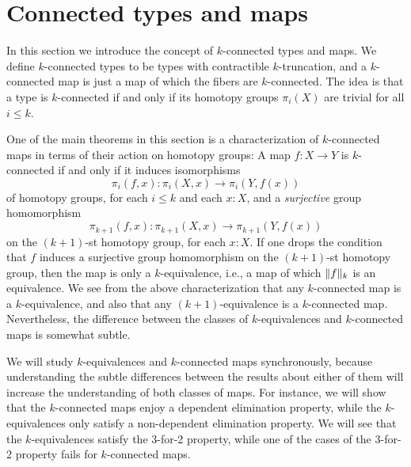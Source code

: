 
\section{Connected types and maps}

In this section we introduce the concept of $k$-connected types and maps. We define $k$-connected types to be types with contractible $k$-truncation, and a $k$-connected map is just a map of which the fibers are $k$-connected. The idea is that a type is $k$-connected if and only if its homotopy groups $\pi_i(X)$ are trivial for all $i\leq k$.

One of the main theorems in this section is a characterization of $k$-connected maps in terms of their action on homotopy groups: A map $f:X\to Y$ is $k$-connected if and only if it induces isomorphisms
\begin{equation*}
  \pi_i(f,x):\pi_i(X,x)\to\pi_i(Y,f(x))
\end{equation*}
of homotopy groups, for each $i\leq k$ and each $x:X$, and a \emph{surjective} group homomorphism
\begin{equation*}
  \pi_{k+1}(f,x):\pi_{k+1}(X,x)\to\pi_{k+1}(Y,f(x))
\end{equation*}
on the $(k+1)$-st homotopy group, for each $x:X$. If one drops the condition that $f$ induces a surjective group homomorphism on the $(k+1)$-st homotopy group, then the map is only a $k$-equivalence, i.e., a map of which $\trunc{k}{f}$ is an equivalence. We see from the above characterization that any $k$-connected map is a $k$-equivalence, and also that any $(k+1)$-equivalence is a $k$-connected map. Nevertheless, the difference between the classes of $k$-equivalences and $k$-connected maps is somewhat subtle.

We will study $k$-equivalences and $k$-connected maps synchronously, because understanding the subtle differences between the results about either of them will increase the understanding of both classes of maps. For instance, we will show that the $k$-connected maps enjoy a dependent elimination property, while the $k$-equivalences only satisfy a non-dependent elimination property. We will see that the $k$-equivalences satisfy the 3-for-2 property, while one of the cases of the 3-for-2 property fails for $k$-connected maps.

